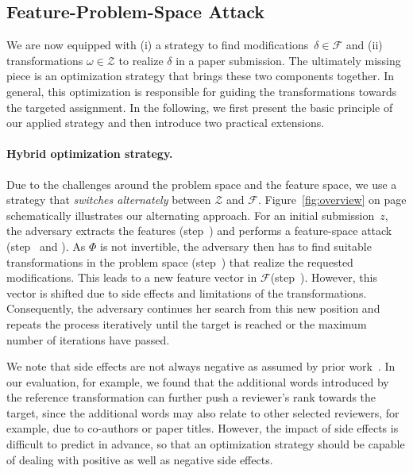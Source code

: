 \documentclass[letterpaper,twocolumn,10pt]{article}
\newcommand{\stepone}{\ding{182}\xspace}
\newcommand{\steptwo}{\ding{183}\xspace}
\newcommand{\stepthree}{\ding{184}\xspace}
\newcommand{\stepfour}{\ding{185}\xspace}
\newcommand{\stepfive}{\ding{186}\xspace}
\newcommand{\extractor}{\Phi}
\newcommand{\modifications}{\delta}
\newcommand{\Dom}{\ensuremath{\mathcal{Z}}\xspace}
\newcommand{\F}{\ensuremath{\mathcal{F}}\xspace}
\newcommand{\inputpdf}{\ensuremath{z}\xspace}
\newcommand{\transformation}{\ensuremath{\omega}\xspace}
\begin{document}
\subsection{Feature-Problem-Space Attack}
\label{sec:feature-problem-space}

We are now equipped with (i) a strategy to find modifications~\mbox{$\modifications \in \F$} and (ii) transformations \mbox{$\transformation \in \Dom$} to realize $\modifications$ in a paper submission.
The ultimately missing piece is an optimization strategy that brings these two components together. In general, this optimization is responsible for guiding the transformations towards the targeted assignment. 
In the following, we first present the basic principle of our applied strategy and then introduce two practical extensions.

\paragraph{Hybrid optimization strategy.}
Due to the challenges around the problem space and the feature space, we use a strategy that \emph{switches alternately} between \Dom and \F.
Figure~\ref{fig:overview} on page \pageref{fig:overview} schematically illustrates our alternating approach. For an initial submission~\inputpdf, the adversary extracts the features (step~\stepone) and performs a feature-space attack (step~\steptwo and \stepthree). As $\extractor$ is not invertible, the adversary then has to find suitable transformations in the problem space (step~\stepfour) that realize the requested modifications. This leads to a new feature vector in \F (step~\stepfive). However, this vector is shifted due to side effects and limitations of the transformations. Consequently, the adversary continues her search from this new position and repeats the process iteratively until the target is reached or the maximum number of iterations have passed.

We note that side effects are not always negative as assumed by prior work~\cite{pierazzi-20-intriguing}. In our evaluation, for example, we found that the additional words introduced by the reference transformation can further push a reviewer's rank towards the target, since the additional words may also relate to other selected reviewers, for example, due to co-authors or paper titles. However, the impact of side effects is difficult to predict in advance, so that an optimization strategy should be capable of dealing with positive as well as negative side effects.
\end{document}
